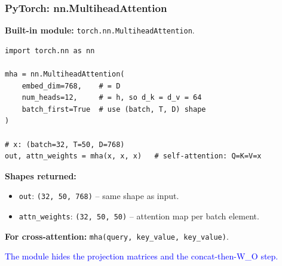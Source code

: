 \documentclass[notes,11pt, aspectratio=169]{beamer}
\begin{document}
\begin{frame}[fragile]
\frametitle{PyTorch: nn.MultiheadAttention}

\textbf{Built-in module:} \texttt{torch.nn.MultiheadAttention}.

\vspace{4pt}
\begin{lstlisting}
import torch.nn as nn

mha = nn.MultiheadAttention(
    embed_dim=768,    # = D
    num_heads=12,     # = h, so d_k = d_v = 64
    batch_first=True  # use (batch, T, D) shape
)

# x: (batch=32, T=50, D=768)
out, attn_weights = mha(x, x, x)   # self-attention: Q=K=V=x
\end{lstlisting}

\vspace{6pt}
\textbf{Shapes returned:}
\begin{itemize}
    \item \texttt{out}: \texttt{(32, 50, 768)} -- same shape as input.
    \item \texttt{attn\_weights}: \texttt{(32, 50, 50)} -- attention map per batch element.
\end{itemize}

\vspace{6pt}
\textbf{For cross-attention:} \texttt{mha(query, key\_value, key\_value)}.

\vspace{4pt}
\textcolor{blue}{The module hides the projection matrices and the concat-then-W\_O step.}
\end{frame}
\end{document}
